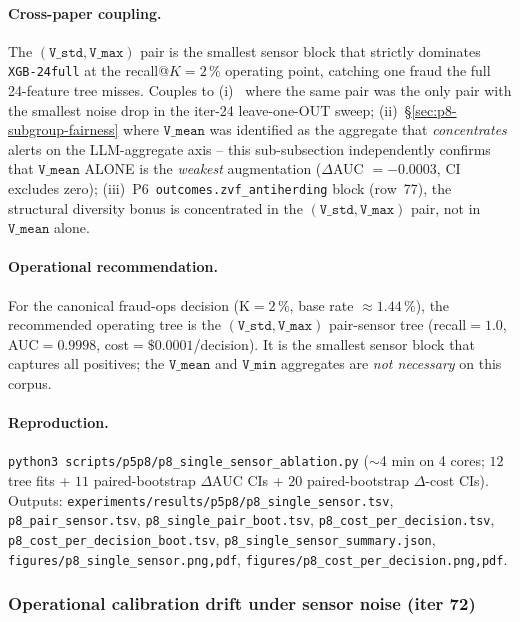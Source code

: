 \paragraph{Cross-paper coupling.}
The $(\texttt{V\_std}, \texttt{V\_max})$ pair is the smallest sensor
block that strictly dominates \texttt{XGB-24full} at the
recall@$K{=}2\,\%$ operating point, catching one fraud the full
24-feature tree misses. Couples to (i)~
where the same pair was the only pair with the smallest noise
drop in the iter-24 leave-one-OUT sweep; (ii)~\S\ref{sec:p8-subgroup-fairness}
where $\texttt{V\_mean}$ was identified as the aggregate that
\emph{concentrates} alerts on the LLM-aggregate axis -- this
sub-subsection independently confirms that $\texttt{V\_mean}$ ALONE
is the \emph{weakest} augmentation ($\Delta$AUC $=-0.0003$, CI
excludes zero); (iii)~P6~\texttt{outcomes.zvf\_antiherding} block
(row~77), the structural diversity bonus is concentrated in the
$(\texttt{V\_std}, \texttt{V\_max})$ pair, not in $\texttt{V\_mean}$
alone.

\paragraph{Operational recommendation.}
For the canonical fraud-ops decision (K$ = 2\,\%$, base rate
$\approx 1.44\,\%$), the recommended operating tree is the
$(\texttt{V\_std}, \texttt{V\_max})$ pair-sensor tree (recall$ = 1.0$,
AUC$ = 0.9998$, cost$ = \$0.0001$/decision). It is the smallest
sensor block that captures all positives; the $\texttt{V\_mean}$
and $\texttt{V\_min}$ aggregates are \emph{not necessary} on this
corpus.

\paragraph{Reproduction.}
\texttt{python3 scripts/p5p8/p8\_single\_sensor\_ablation.py}
($\sim$4 min on 4 cores; $12$ tree fits + $11$ paired-bootstrap
$\Delta$AUC CIs + $20$ paired-bootstrap $\Delta$-cost CIs).
Outputs: \texttt{experiments/results/p5p8/p8\_single\_sensor.tsv},
\texttt{p8\_pair\_sensor.tsv}, \texttt{p8\_single\_pair\_boot.tsv},
\texttt{p8\_cost\_per\_decision.tsv},
\texttt{p8\_cost\_per\_decision\_boot.tsv},
\texttt{p8\_single\_sensor\_summary.json},
\texttt{figures/p8\_single\_sensor.{png,pdf}},
\texttt{figures/p8\_cost\_per\_decision.{png,pdf}}.

\subsubsection{Operational calibration drift under sensor noise (iter 72)}
\label{sec:p8-calib-noise}

